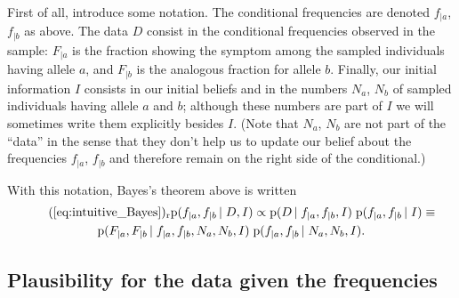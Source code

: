 \documentclass[\ifafour a4paper,12pt,\else a5paper,10pt,\fi%
onecolumn,oneside,article,%
british%
]{memoir}
\theoremstyle{remark}
\theoremstyle{innote}
\newcommand*{\pf}{\mathrm{p}}%
\renewcommand*{\|}[1][]{\nonscript\,#1\vert\nonscript\;\mathopen{}}
\newcommand*{\labelbis}[1]{\tag*{(\ref{#1})$_\text{r}$}}
\newcommand*{\snp}{\textsc{snp}}
\newcommand*{\yD}{D}
\newcommand*{\yI}{I}
\newcommand*{\ya}{a}
\newcommand*{\yb}{b}
\newcommand*{\ysS}{s}%
\begin{document}
First of all, introduce some notation. The conditional frequencies are
denoted $f_{|\ya}$, $f_{|\yb}$ as above. The data $\yD$ consist in the
conditional frequencies observed in the sample: $F_{|\ya}$ is the fraction
showing the symptom among the sampled individuals having allele $\ya$, and
$F_{|\yb}$ is the analogous fraction for allele $\yb$. Finally, our initial
information $\yI$ consists in our initial beliefs and in the numbers
$N_{\ya}$, $N_{\yb}$ of sampled individuals having allele $\ya$ and $\yb$;
although these numbers are part of $\yI$ we will sometimes write them
explicitly besides $\yI$. (Note that $N_{\ya}$, $N_{\yb}$ are not part of
the \enquote{data} in the sense that they don't help us to update our
belief about the frequencies $f_{|\ya}$, $f_{|\yb}$ and therefore remain on
the right side of the conditional.)

With this notation, Bayes's theorem above is written
\begin{multline}
  \labelbis{eq:intuitive_Bayes}
  \pf(f_{|\ya}, f_{|\yb} \| \yD, \yI)
  \propto
  \pf(\yD \|f_{|\ya}, f_{|\yb}, \yI)\;
  \pf(f_{|\ya}, f_{|\yb} \| \yI)
  \equiv{}\\
  \pf(F_{|\ya}, F_{|\yb} \|f_{|\ya}, f_{|\yb}, N_{\ya},N_{\yb},\yI)\;
  \pf(f_{|\ya}, f_{|\yb} \| N_{\ya},N_{\yb},\yI).
\end{multline}

\medskip

\subsection{Plausibility for the data given the frequencies}
\label{sec:p_data_from_freqs}
\end{document}
